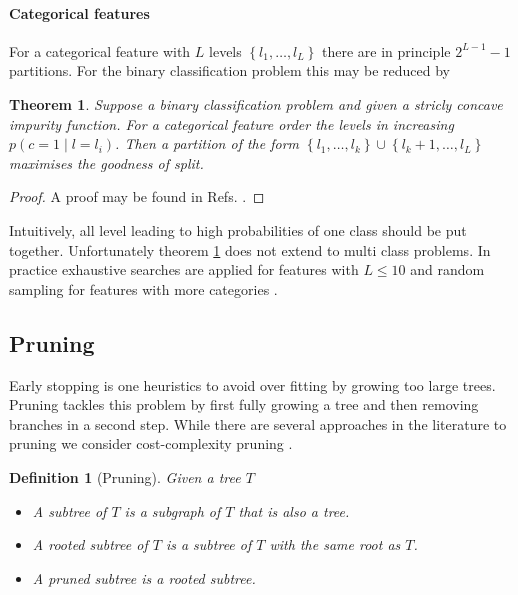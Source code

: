 \documentclass[12pt,a4paper]{article}
\newtheorem{theorem}{Theorem}
\newtheorem{definition}{Definition}
\begin{document}
\paragraph{Categorical features}
For a categorical feature with $L$ levels $\left\{l_1, \dots, l_L\right\}$ there are in principle $2^{L-1} - 1$  partitions. For the  binary classification problem this may be reduced by
\begin{theorem}\label{thm:categorical_splits}
	Suppose a binary classification problem and given a stricly concave impurity function. For a categorical feature order the levels in increasing $p(c=1 \mid  l = l_i)$. Then a partition of the form $\left\{l_1, \dots, l_k\right\} \cup \left\{l_k+1, \dots, l_L\right\}$ maximises the goodness of split.
\end{theorem}
\begin{proof}
	A proof may be found in  Refs. \cite{Ripley1995, cart84}.
\end{proof}
Intuitively, all level leading to high probabilities of one class should be put together. 
Unfortunately theorem \ref{thm:categorical_splits} does not extend to multi class problems.
In practice exhaustive searches are applied for features with $L \leq 10$ and random sampling for features with more categories \cite{understanding_random_forests}.
\subsection{Pruning}
Early stopping is one heuristics to avoid over fitting by growing too large trees. Pruning tackles this problem by first fully growing a tree and then removing branches in a second step. While there are several approaches in the literature to pruning we consider  cost-complexity pruning \cite{cart84}.
\begin{definition}[Pruning]
	Given a tree $T$
	\begin{itemize}
		\item A subtree of $T$ is a subgraph of $T$ that is also a tree.
		\item A rooted subtree of $T$ is a subtree of $T$ with the same root as $T$.
		\item A pruned subtree is a rooted subtree. 
	\end{itemize}
\end{definition}
\end{document}
